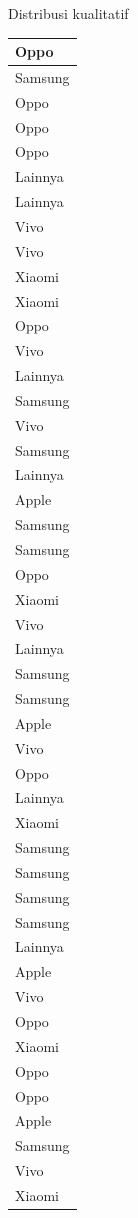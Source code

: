 \documentclass[
  ignorenonframetext,
]{beamer}
\begin{document}
\begin{frame}[s]{Distribusi kualitatif}
\begin{table}
\begin{tabular}[t]{l}
\hline
Oppo\\
\hline
Samsung\\
\hline
Oppo\\
\hline
Oppo\\
\hline
Oppo\\
\hline
Lainnya\\
\hline
Lainnya\\
\hline
Vivo\\
\hline
Vivo\\
\hline
Xiaomi\\
\hline
Xiaomi\\
\hline
Oppo\\
\hline
Vivo\\
\hline
Lainnya\\
\hline
Samsung\\
\hline
Vivo\\
\hline
Samsung\\
\hline
Lainnya\\
\hline
Apple\\
\hline
Samsung\\
\hline
Samsung\\
\hline
Oppo\\
\hline
Xiaomi\\
\hline
Vivo\\
\hline
Lainnya\\
\hline
Samsung\\
\hline
Samsung\\
\hline
Apple\\
\hline
Vivo\\
\hline
Oppo\\
\hline
Lainnya\\
\hline
Xiaomi\\
\hline
Samsung\\
\hline
Samsung\\
\hline
Samsung\\
\hline
Samsung\\
\hline
Lainnya\\
\hline
Apple\\
\hline
Vivo\\
\hline
Oppo\\
\hline
Xiaomi\\
\hline
Oppo\\
\hline
Oppo\\
\hline
Apple\\
\hline
Samsung\\
\hline
Vivo\\
\hline
Xiaomi\\

\end{tabular}
\end{table}
\end{frame}
\end{document}
